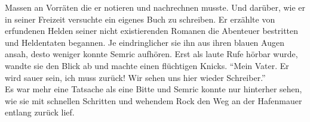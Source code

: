Massen an Vorräten die er notieren und nachrechnen musste. Und darüber, wie er in seiner Freizeit 
versuchte ein eigenes Buch zu schreiben. Er erzählte von erfundenen Helden seiner nicht 
existierenden Romanen die Abenteuer bestritten und Heldentaten begannen. Je eindringlicher sie ihn 
aus ihren blauen Augen ansah, desto weniger konnte Semric aufhören. Erst als laute Rufe hörbar 
wurde, wandte sie den Blick ab und machte einen flüchtigen Knicks. ``Mein Vater. Er wird sauer 
sein, ich muss zurück! Wir sehen uns hier wieder Schreiber.''\\
Es war mehr eine Tatsache als eine Bitte und Semric konnte nur hinterher sehen, wie sie mit 
schnellen Schritten und wehendem Rock den Weg an der Hafenmauer entlang zurück lief.\\



